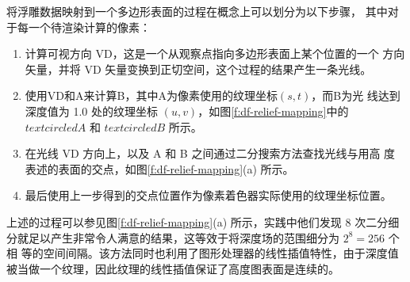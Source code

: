 将浮雕数据映射到一个多边形表面的过程在概念上可以划分为以下步骤， 其中对于每一个待渲染计算的像素：

\begin{enumerate}
	\item 计算可视方向 VD，这是一个从观察点指向多边形表面上某个位置的一个 方向矢量，并将 VD 矢量变换到正切空间，这个过程的结果产生一条光线。
	\item 使用VD和A来计算B，其中A为像素使用的纹理坐标$(s,t)$，而B为光 线达到深度值为 1.0 处的纹理坐标 $(u, v)$，如图\ref{f:df-relief-mapping}中的 $textcircled{A}$ 和 $textcircled{B}$ 所示。
	\item 在光线 VD 方向上，以及 A 和 B 之间通过二分搜索方法查找光线与用高 度表述的表面的交点，如图\ref{f:df-relief-mapping}(a) 所示。
	\item 最后使用上一步得到的交点位置作为像素着色器实际使用的纹理坐标位置。
\end{enumerate}

上述的过程可以参见图\ref{f:df-relief-mapping}(a) 所示，实践中他们发现 8 次二分细分就足以产生非常令人满意的结果，这等效于将深度场的范围细分为 $2^{8} = 256$ 个相 等的空间间隔。该方法同时也利用了图形处理器的线性插值特性，由于深度值 被当做一个纹理，因此纹理的线性插值保证了高度图表面是连续的。

